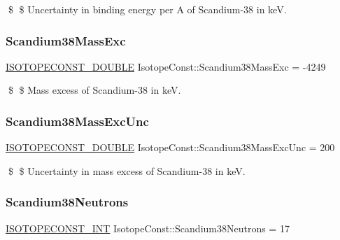 \$ \$ Uncertainty in binding energy per A of Scandium-\/38 in keV. \mbox{\label{group___isotope_const-_scandium-_sc38_ga5c0c86a35e3afce936d5244735ae5a15}} 
\subsubsection{\texorpdfstring{Scandium38\+Mass\+Exc}{Scandium38MassExc}}
{\footnotesize\ttfamily \mbox{\hyperlink{group___isotope_const-_macros_ga8f45a7272ce02c0b4c65c44636ed719a}{I\+S\+O\+T\+O\+P\+E\+C\+O\+N\+S\+T\+\_\+\+D\+O\+U\+B\+LE}} Isotope\+Const\+::\+Scandium38\+Mass\+Exc = -\/4249}

\$ \$ Mass excess of Scandium-\/38 in keV. \mbox{\label{group___isotope_const-_scandium-_sc38_ga0d8c01b2a2241bcce9bae3cae62ec22f}} 
\subsubsection{\texorpdfstring{Scandium38\+Mass\+Exc\+Unc}{Scandium38MassExcUnc}}
{\footnotesize\ttfamily \mbox{\hyperlink{group___isotope_const-_macros_ga8f45a7272ce02c0b4c65c44636ed719a}{I\+S\+O\+T\+O\+P\+E\+C\+O\+N\+S\+T\+\_\+\+D\+O\+U\+B\+LE}} Isotope\+Const\+::\+Scandium38\+Mass\+Exc\+Unc = 200}

\$ \$ Uncertainty in mass excess of Scandium-\/38 in keV. \mbox{\label{group___isotope_const-_scandium-_sc38_ga3b26eeab79e9b82caf7ba5ea226dccfb}} 
\subsubsection{\texorpdfstring{Scandium38\+Neutrons}{Scandium38Neutrons}}
{\footnotesize\ttfamily \mbox{\hyperlink{group___isotope_const-_macros_ga5f18360b3e99483a35c32d789e62621c}{I\+S\+O\+T\+O\+P\+E\+C\+O\+N\+S\+T\+\_\+\+I\+NT}} Isotope\+Const\+::\+Scandium38\+Neutrons = 17}

